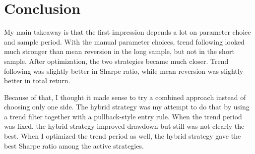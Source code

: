 \documentclass[11pt]{article}
\begin{document}
\begin{table}[H]
\centering
\caption{Full Comparison of All Main Results}
\label{tab:all_results}
\end{table}

\section{Conclusion}
My main takeaway is that the first impression depends a lot on parameter choice and sample period. With the manual parameter choices, trend following looked much stronger than mean reversion in the long sample, but not in the short sample. After optimization, the two strategies became much closer. Trend following was slightly better in Sharpe ratio, while mean reversion was slightly better in total return.

Because of that, I thought it made sense to try a combined approach instead of choosing only one side. The hybrid strategy was my attempt to do that by using a trend filter together with a pullback-style entry rule. When the trend period was fixed, the hybrid strategy improved drawdown but still was not clearly the best. When I optimized the trend period as well, the hybrid strategy gave the best Sharpe ratio among the active strategies.
\end{document}
